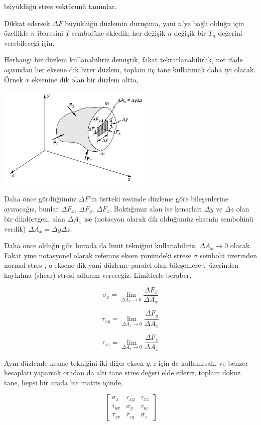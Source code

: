 \documentclass[12pt,fleqn]{article}\usepackage{../../common}
\begin{document}
büyüklüğü stres vektörünü tanımlar.

Dikkat edersek $\Delta F$ büyüklüğü düzlemin duruşuna, yani $n$'ye bağlı olduğu
için özellikle $n$ ibaresini $T$ sembolüne ekledik; her değişik $n$ değişik bir
$T_n$ değerini verebileceği için.

Herhangi bir düzlem kullanabiliriz demiştik, fakat tekrarlanabilirlik, net ifade
açısından her eksene dik birer düzlem, toplam üç tane kullanmak daha iyi
olacak. Örnek $x$ eksenine dik olan bir düzlem altta,

\includegraphics[width=20em]{phy_020_strs_02_app_03.jpg}

Daha önce gördüğümüz $\Delta F$'in üstteki resimde düzleme göre bileşenlerine
ayıracağız, bunlar $\Delta F_x$, $\Delta F_y$, $\Delta F_z$. Baktığımız alan ise
kenarları $\Delta y$ ve $\Delta z$ olan bir dikdörtgen, alan $\Delta A_x$ ise
(notasyon olarak dik olduğumüz eksenin sembolünü verdik)
$\Delta A_x = \Delta y \Delta z$.

Daha önce olduğu gibi burada da limit tekniğini kullanabiliriz, $\Delta A_x \to
0$ olacak. Fakat yine notasyonel olarak referans eksen yönündeki strese $\sigma$
sembolü üzerinden normal stres , o eksene dik yani düzleme paralel olan
bileşenlere $\tau$ üzerinden kaykılma (shear) stresi adlarını vereceğiz.
Limitlerle beraber,

$$
\sigma_x = \lim_{\Delta A_x \to 0 } \frac{\Delta F_x}{\Delta A_x}
$$

$$
\tau_{xy} = \lim_{\Delta A_x \to 0 } \frac{\Delta F_y}{\Delta A_x}
$$

$$
\tau_{xz} = \lim_{\Delta A_x \to 0 } \frac{\Delta F_z}{\Delta A_x}
$$

Aynı düzlemle kesme tekniğini iki diğer eksen $y,z$ için de kullanırsak, ve
benzer hesapları yaparsak oradan da altı tane stres değeri elde ederiz, toplam
dokuz tane, hepsi bir arada bir matris içinde,

$$
\left[\begin{array}{rrr}
\sigma_x & \tau_{xy} & \tau_{xz} \\
\tau_{yx} & \sigma_y & \tau_{yz} \\
\tau_{zx} & \tau_{zy} & \sigma_z
\end{array}\right]
$$
\end{document}
